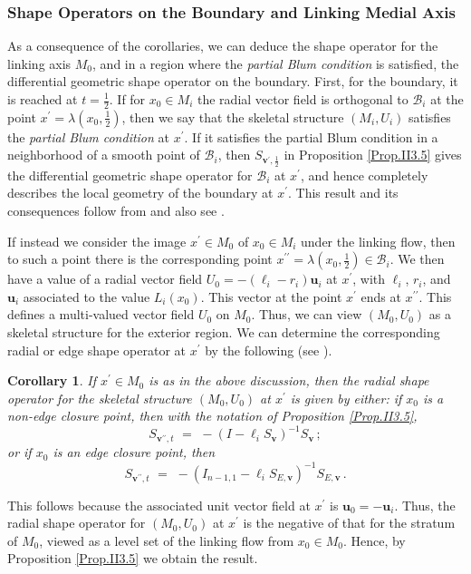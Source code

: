 \documentclass[10pt]{amsart}
\newtheorem{Corollary}[Thm]{Corollary}
\theoremstyle{definition}
\theoremstyle{definition}
\numberwithin{equation}{section}
\def \bu {\mathbf {u}}
\def \bv {\mathbf {v}}
\def \cB {\mathcal{B}}
\def \gl {\lambda}
\begin{document}
\subsubsection*{Shape Operators on the Boundary and  Linking Medial 
Axis} 
\par
As a consequence of the corollaries, we can deduce the shape operator for 
the linking axis $M_0$, and in a region where the {\em partial Blum 
condition} is satisfied, the differential geometric shape operator on the 
boundary.  First, for the boundary, it is reached at $t = \frac{1}{2}$.  If for 
$x_0 \in M_i$ the radial vector field is orthogonal to $\cB_i$ at the point 
$x^{\prime} = \gl(x_0, \frac{1}{2})$, then we say that the skeletal 
structure $(M_i, U_i)$ satisfies the {\em partial Blum condition} at 
$x^{\prime}$.  If it satisfies the partial Blum condition in a neighborhood 
of a smooth point of $\cB_i$, then $S_{\bv^{\prime}, \frac{1}{2}}$ in 
Proposition \ref{Prop.II3.5} gives the differential geometric shape 
operator for $\cB_i$ at $x^{\prime}$, and hence completely describes the 
local geometry of the boundary at $x^{\prime}$.  This result and its 
consequences follow from \cite[\S 3]{D2} and also see \cite[\S 3]{D3}. 
\par
If instead we consider the image $x^{\prime} \in M_0$ of $x_0 \in M_i$ 
under the linking flow, then to such a point there is the corresponding 
point $x^{\prime\prime} = \gl(x_0, \frac{1}{2}) \in \cB_i$.  We then have a 
value of a radial vector field $U_0 = -(\ell_i - r_i)\bu_i$ at $x^{\prime}$, 
with $\ell_i$, $r_i$, and $\bu_i$ associated to the value $L_i(x_0)$.  This 
vector at the point $x^{\prime}$ ends at $x^{\prime\prime}$.  
This defines a multi-valued vector field $U_0$ on $M_0$.  Thus, we can 
view $(M_0, U_0)$ as a skeletal structure for the exterior region.  We can 
determine the corresponding radial or edge shape operator at $x^{\prime}$ 
by the following (see \cite[Cor. 8.7]{DG}).  
\begin{Corollary}  
\label{Cor.II3.7}
If $x^{\prime} \in M_0$ is as in the above discussion, then the radial shape 
operator for the skeletal structure $(M_0, U_0)$ at $x^{\prime}$ is given 
by either: if $x_0$ is a non-edge closure point, then with the notation of 
Proposition \ref{Prop.II3.5}, 
$$  S_{\bv^{\prime\prime}, t} \,\,  = \,\,  - (I - \ell_i S_{\bv})^{-1}S_{\bv} 
\, ;  $$
or if $x_0$ is an edge closure point, then 
$$  S_{\bv^{\prime\prime}, t} \,\,  = \,\,  - (I_{n-1,1} - \ell_i 
 S_{E, \bv})^{-1}S_{E, \bv} \, .  $$
\end{Corollary}
\par
This follows because the associated unit vector field at $x^{\prime}$ is 
$\bu_0 = -\bu_i$.  Thus, the radial shape operator for $(M_0, U_0)$ at 
$x^{\prime}$ is the negative of that for the stratum of $M_0$, viewed as a 
level set of the linking flow from $x_0 \in M_0$.  Hence, by Proposition 
\ref{Prop.II3.5} we obtain the result. 
\end{document}
